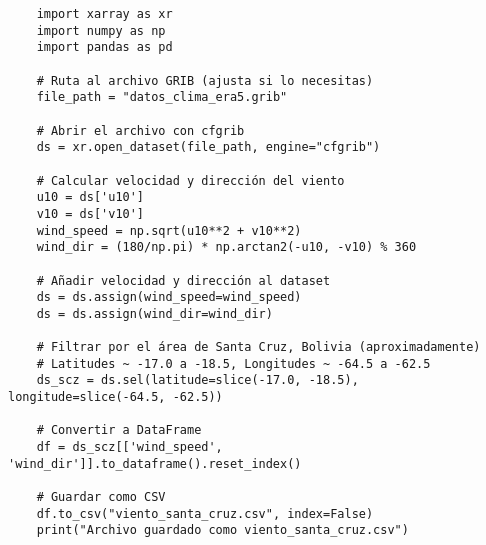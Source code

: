 \begin{lstlisting}
	import xarray as xr
	import numpy as np
	import pandas as pd
	
	# Ruta al archivo GRIB (ajusta si lo necesitas)
	file_path = "datos_clima_era5.grib"
	
	# Abrir el archivo con cfgrib
	ds = xr.open_dataset(file_path, engine="cfgrib")
	
	# Calcular velocidad y dirección del viento
	u10 = ds['u10']
	v10 = ds['v10']
	wind_speed = np.sqrt(u10**2 + v10**2)
	wind_dir = (180/np.pi) * np.arctan2(-u10, -v10) % 360
	
	# Añadir velocidad y dirección al dataset
	ds = ds.assign(wind_speed=wind_speed)
	ds = ds.assign(wind_dir=wind_dir)
	
	# Filtrar por el área de Santa Cruz, Bolivia (aproximadamente)
	# Latitudes ~ -17.0 a -18.5, Longitudes ~ -64.5 a -62.5
	ds_scz = ds.sel(latitude=slice(-17.0, -18.5), longitude=slice(-64.5, -62.5))
	
	# Convertir a DataFrame
	df = ds_scz[['wind_speed', 'wind_dir']].to_dataframe().reset_index()
	
	# Guardar como CSV
	df.to_csv("viento_santa_cruz.csv", index=False)
	print("Archivo guardado como viento_santa_cruz.csv")
\end{lstlisting}